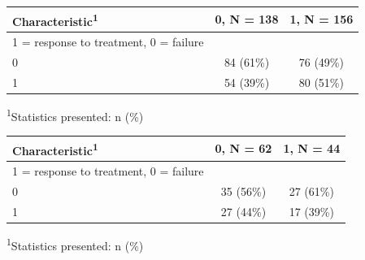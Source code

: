 \documentclass[]{book}
\newenvironment{Shaded}{\begin{snugshade}}{\end{snugshade}}
\newcommand{\CommentTok}[1]{\textcolor[rgb]{0.56,0.35,0.01}{\textit{#1}}}
\newcommand{\DataTypeTok}[1]{\textcolor[rgb]{0.13,0.29,0.53}{#1}}
\newcommand{\DecValTok}[1]{\textcolor[rgb]{0.00,0.00,0.81}{#1}}
\newcommand{\KeywordTok}[1]{\textcolor[rgb]{0.13,0.29,0.53}{\textbf{#1}}}
\newcommand{\NormalTok}[1]{#1}
\newcommand{\OperatorTok}[1]{\textcolor[rgb]{0.81,0.36,0.00}{\textbf{#1}}}
\newcommand{\OtherTok}[1]{\textcolor[rgb]{0.56,0.35,0.01}{#1}}
\newcommand{\StringTok}[1]{\textcolor[rgb]{0.31,0.60,0.02}{#1}}
\begin{document}
\captionsetup[table]{labelformat=empty,skip=1pt}
\begin{longtable}{lcc}
\toprule
\textbf{Characteristic}\textsuperscript{1} & \textbf{0}, N = 138 & \textbf{1}, N = 156 \\ 
\midrule
1 = response to treatment, 0 = failure &  &  \\ 
0 & 84 (61\%) & 76 (49\%) \\ 
1 & 54 (39\%) & 80 (51\%) \\ 
\bottomrule
\end{longtable}
\vspace{-5mm}
\begin{minipage}{\linewidth}
\textsuperscript{1}Statistics presented: n (\%) \\ 
\end{minipage}

\begin{Shaded}
\end{Shaded}

\captionsetup[table]{labelformat=empty,skip=1pt}
\begin{longtable}{lcc}
\toprule
\textbf{Characteristic}\textsuperscript{1} & \textbf{0}, N = 62 & \textbf{1}, N = 44 \\ 
\midrule
1 = response to treatment, 0 = failure &  &  \\ 
0 & 35 (56\%) & 27 (61\%) \\ 
1 & 27 (44\%) & 17 (39\%) \\ 
\bottomrule
\end{longtable}
\vspace{-5mm}
\begin{minipage}{\linewidth}
\textsuperscript{1}Statistics presented: n (\%) \\ 
\end{minipage}

\begin{Shaded}
\end{Shaded}
\end{document}
